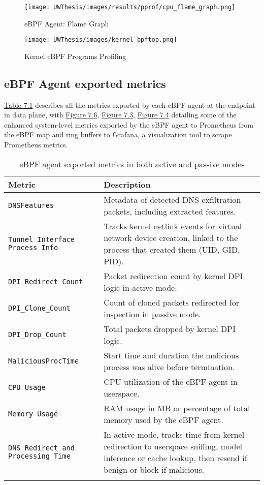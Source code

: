 \documentclass [11pt, proquest] {uwthesis}[2020/02/24]
\begin{document}
\begin{figure}[htbp]
    \centering
    \texttt{[image: UWThesis/images/results/pprof/cpu\_flame\_graph.png]}
    \caption{eBPF Agent: Flame Graph}
    \label{fig:c4}
\end{figure}

\begin{figure}[htbp]
    \centering
    \texttt{[image: UWThesis/images/kernel\_bpftop.png]}
    \caption{Kernel eBPF Programs Profiling}
    \label{fig:c3}
\end{figure}


\vspace{-25pt}
\subsection{eBPF Agent exported metrics}
\hyperref[sec:dp_ebpf_node_metrics]{Table 7.1} describes all the metrics exported by each eBPF agent at the endpoint in data plane, with \hyperref[fig:dns-exfil-packet-metrics]{Figure 7.6}, \hyperref[fig:p1]{Figure 7.3}, \hyperref[fig:p2]{Figure 7.4}  detailing some of the enhanced system-level metrics exported by the eBPF agent to Prometheus from the eBPF map and ring buffers to Grafana, a visualization tool to scrape Prometheus metrics.

\begin{longtable}{|p{4cm}|p{10cm}|}
\hline
\textbf{Metric} & \textbf{Description} \\
\hline
\texttt{DNSFeatures} & Metadata of detected DNS exfiltration packets, including extracted features. \\
\hline
\texttt{Tunnel Interface Process Info} & Tracks kernel netlink events for virtual network device creation, linked to the process that created them (UID, GID, PID). \\
\hline
\texttt{DPI\_Redirect\_Count} & Packet redirection count by kernel DPI logic in active mode. \\
\hline
\texttt{DPI\_Clone\_Count} & Count of cloned packets redirected for inspection in passive mode. \\
\hline
\texttt{DPI\_Drop\_Count} & Total packets dropped by kernel DPI logic. \\
\hline
\texttt{MaliciousProcTime} & Start time and duration the malicious process was alive before termination. \\
\hline
\texttt{CPU Usage} & CPU utilization of the eBPF agent in userspace. \\
\hline
\texttt{Memory Usage} & RAM usage in MB or percentage of total memory used by the eBPF agent. \\
\hline
\texttt{DNS Redirect and Processing Time} & In active mode, tracks time from kernel redirection to userspace sniffing, model inference or cache lookup, then resend if benign or block if malicious. \\
\hline
\caption{eBPF agent exported metrics in both active and passive modes}
\label{sec:dp_ebpf_node_metrics}
\end{longtable}
\end{document}
